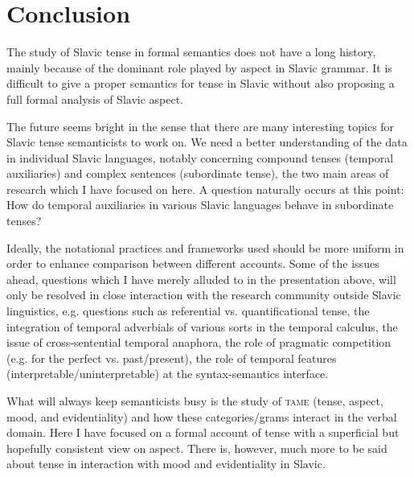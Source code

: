 \documentclass[output=paper,colorlinks,citecolor=brown]{langscibook}
\begin{document}
\section{Conclusion}
\label{sec:5}

The study of Slavic tense in formal semantics does not have a long history, mainly because of the dominant role played by aspect in  Slavic grammar. It is difficult to give a proper semantics for tense in Slavic without also proposing a full formal analysis of Slavic aspect.

The future seems bright in the sense that there are many interesting topics for Slavic tense semanticists to work on. We need a better understanding of the data in individual Slavic languages, notably concerning  compound tenses (temporal auxiliaries) and  complex sentences (subordinate tense), the two main areas of research which I have focused on here. A question naturally occurs at this point: How do temporal auxiliaries in various Slavic languages behave in subordinate tenses? 

 Ideally, the notational practices and frameworks used should be more uniform in order to enhance comparison between different accounts. Some of the issues ahead, questions which I have merely alluded to in the presentation above, will only be resolved in close interaction with the research community outside Slavic linguistics, e.g. questions such as  referential vs. quantificational tense, the integration of temporal adverbials of various sorts in the temporal calculus, the issue of  cross-sentential temporal anaphora, the role of pragmatic competition (e.g. for the perfect vs. past/present), the role of temporal features (interpretable/uninterpretable) at the syntax-semantics interface.

 What will always keep  semanticists busy is the study of \textsc{tame} (tense, aspect, mood, and evidentiality) and how these categories/grams interact in the verbal domain. Here I have focused on a formal account of tense with a  superficial but hopefully consistent view on aspect. There is, however, much more to be said about tense in interaction with mood and evidentiality in Slavic. 




\end{document}
